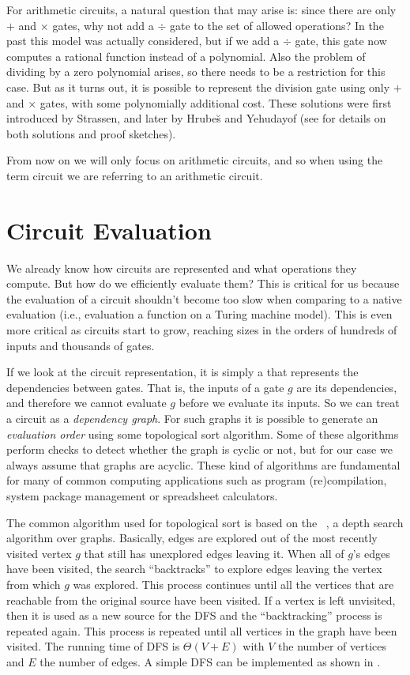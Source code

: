 For arithmetic circuits, a natural question that may arise is: since there are
only $+$ and $\times$ gates, why not add a $\div$ gate to the set of allowed
operations? In the past this model was actually considered, but if we add
a $\div$ gate, this gate now computes a rational function instead of
a polynomial.  Also the problem of dividing by a zero polynomial arises, so
there needs to be a restriction for this case. But as it turns out, it is
possible to represent the division gate using only $+$ and $\times$ gates, with
some polynomially additional cost. These solutions were first introduced by
Strassen, and later by Hrube\u{s} and Yehudayof (see
\cite[Section~2.5]{Shpilka:2010} for details on both solutions and proof
sketches).

From now on we will only focus on arithmetic circuits, and so when using the
term circuit we are referring to an arithmetic circuit.

\section{Circuit Evaluation}\label{sec:circeval}
We already know how circuits are represented and what operations they compute.
But how do we efficiently evaluate them? This is critical for us because the
evaluation of a circuit shouldn't become too slow when comparing to a native
evaluation (i.e., evaluation a function on a Turing machine model). This is
even more critical as circuits start to grow, reaching sizes in the orders of
hundreds of inputs and thousands of gates.

If we look at the circuit representation, it is simply a  that represents the dependencies between gates. That is, the
inputs of a gate $g$ are its dependencies, and therefore we cannot evaluate $g$
before we evaluate its inputs. So we can treat a circuit as a \emph{dependency
graph}. For such graphs it is possible to generate an \emph{evaluation order}
using some topological sort algorithm. Some of these algorithms perform checks
to detect whether the graph is cyclic or not, but for our case we always assume
that graphs are acyclic. These kind of algorithms are fundamental for many of
common computing applications such as program (re)compilation, system package
management or spreadsheet calculators.

The common algorithm used for topological sort is based on the
~\cite{tarjan1972depth}, a depth search algorithm
over graphs. Basically, edges are explored out of the most recently visited
vertex $g$ that still has unexplored edges leaving it. When all of $g$'s edges
have been visited, the search ``backtracks'' to explore edges leaving the
vertex from which $g$ was explored. This process continues until all the
vertices that are reachable from the original source have been visited. If
a vertex is left unvisited, then it is used as a new source for the DFS and the
``backtracking'' process is repeated again. This process is repeated until all
vertices in the graph have been visited. The running time of DFS is $\Theta(V
+ E)$ with $V$ the number of vertices and $E$ the number of edges. A simple DFS
can be implemented as shown in .

